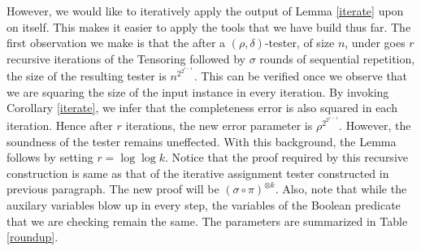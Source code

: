 However, we would like to iteratively apply the output of Lemma
\ref{iterate} upon on itself. This makes it easier to apply the tools
that we have build thus far.  The first observation we make is that
the after a $(\rho, \delta)$-tester, of size $n$, under goes $r$
recursive iterations of the Tensoring followed by $\sigma$ rounds of
sequential repetition, the size of the resulting tester is
$n^{2^{2^{r-1}}}$. This can be verified once we observe that we are
squaring the size of the input instance in every iteration. By
invoking Corollary \ref{iterate}, we infer that the completeness error
is also squared in each iteration. Hence after $r$ iterations, the new
error parameter is $\rho^{2^{2^{r-1}}}$. However, the soundness of the
tester remains uneffected. With this background, the Lemma follows by
setting $ r = \log \log k$. Notice that the proof required by this
recursive construction is same as that of the iterative assignment
tester constructed in previous paragraph.  The new proof will be
$(\sigma \circ \pi)^{\otimes k}$. Also, note that while the auxilary
variables blow up in every step, the variables of the Boolean
predicate that we are checking remain the same. The parameters are
summarized in Table \ref{roundup}.


